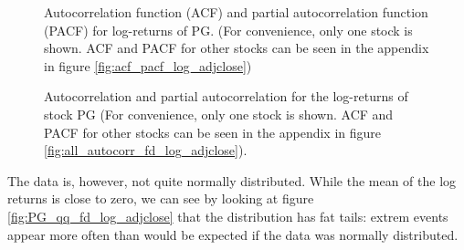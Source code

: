 \begin{figure}[h]
    \centering
    \begin{adjustbox}{width=.95\textwidth,center}
    
    \end{adjustbox}  
    \caption{Autocorrelation function (ACF) and partial autocorrelation function (PACF) for log-returns of PG. (For convenience, only one stock is shown. ACF and PACF for other stocks can be seen in the appendix in figure \ref{fig:acf_pacf_log_adjclose})}
    \label{fig:acf_pacf_log_adjclose_PG}
\end{figure}{}

\begin{table}[h!]
    \centering
    \begin{adjustbox}{width = 0.95\linewidth}
    
    \end{adjustbox}
    \caption{}
    \label{tab:log return means}
\end{table}{}

\begin{figure}[H]
    \centering
    \begin{adjustbox}{width=.95\textwidth,center}
    
    \end{adjustbox}
    \caption{Autocorrelation and partial autocorrelation for the log-returns of stock PG (For convenience, only one stock is shown. ACF and PACF for other stocks can be seen in the appendix in figure \ref{fig:all_autocorr_fd_log_adjclose}).}
    \label{fig:PG_autocorr_fd_log_adjclose}
\end{figure}{}








The data is, however, not quite normally distributed. While the mean of the log returns is close to zero, we can see by looking at figure \ref{fig:PG_qq_fd_log_adjclose} that the distribution has fat tails: extrem events appear more often than would be expected if the data was normally distributed. 

